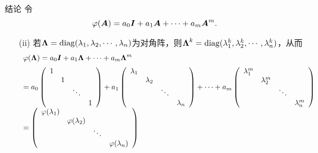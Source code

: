 \begin{frame}
  \begin{scriptsize}
    \begin{block}{结论}
      令
      $$
      \varphi(\boldsymbol{A}) = a_0 \boldsymbol{I} + a_1 \boldsymbol{A} + \cdots + a_m \boldsymbol{A}^m.
      $$
      \begin{itemize}
      \item[(ii)] 若$\boldsymbol{\Lambda}=\mathrm{diag}(\lambda_1,\lambda_2,\cdots,\lambda_n)$为对角阵，则$\boldsymbol{\Lambda}^k=\mathrm{diag}(\lambda_1^k,\lambda_2^k,\cdots,\lambda_n^k)$，从而
        $$
        \begin{array}{l}
          \varphi(\boldsymbol{\Lambda}) = a_0 \boldsymbol{I} + a_1 \boldsymbol{\Lambda} + \cdots + a_m \boldsymbol{\Lambda}^m \\[0.2cm]
          =  a_0 \left(
          \begin{array}{cccc}
            1 & & &\\
            & 1 & & \\
            & & \ddots & \\
            & & & 1
          \end{array}
          \right)
          + a_1 \left(
          \begin{array}{cccc}
            \lambda_1 & & &\\
            & \lambda_2 & & \\
            & & \ddots & \\
            & & & \lambda_n
          \end{array}
          \right) + \cdots +  a_m \left(
          \begin{array}{cccc}
            \lambda_1^m & & &\\
            & \lambda_2^m & & \\
            & & \ddots & \\
            & & & \lambda_n^m
          \end{array}
          \right)  \\[0.6cm]
          =\left(
          \begin{array}{cccc}
            \varphi(\lambda_1) & & &\\
            & \varphi(\lambda_2) & & \\
            & & \ddots & \\
            & & & \varphi(\lambda_n)
          \end{array}
          \right)
        \end{array}
        $$
      \end{itemize}
    \end{block}
  \end{scriptsize}
\end{frame}
